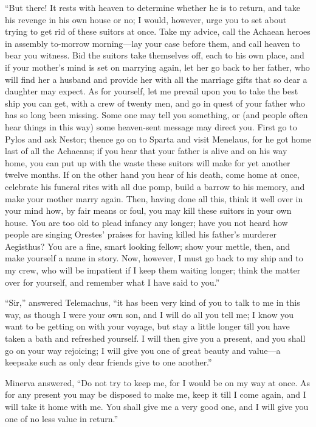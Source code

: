 “But there! It rests with heaven to determine whether he is to return, and take
his revenge in his own house or no; I would, however, urge you to set about
trying to get rid of these suitors at once. Take my advice, call the Achaean
heroes in assembly to-morrow morning—lay your case before them, and call heaven
to bear you witness. Bid the suitors take themselves off, each to his own
place, and if your mother’s mind is set on marrying again, let her go back to
her father, who will find her a husband and provide her with all the marriage
gifts that so dear a daughter may expect. As for yourself, let me prevail upon
you to take the best ship you can get, with a crew of twenty men, and go in
quest of your father who has so long been missing. Some one may tell you
something, or (and people often hear things in this way) some heaven-sent
message may direct you. First go to Pylos and ask Nestor; thence go on to
Sparta and visit Menelaus, for he got home last of all the Achaeans; if you
hear that your father is alive and on his way home, you can put up with the
waste these suitors will make for yet another twelve months. If on the other
hand you hear of his death, come home at once, celebrate his funeral rites with
all due pomp, build a barrow to his memory, and make your mother marry again.
Then, having done all this, think it well over in your mind how, by fair means
or foul, you may kill these suitors in your own house. You are too old to plead
infancy any longer; have you not heard how people are singing Orestes’ praises
for having killed his father’s murderer Aegisthus? You are a fine, smart
looking fellow; show your mettle, then, and make yourself a name in story. Now,
however, I must go back to my ship and to my crew, who will be impatient if I
keep them waiting longer; think the matter over for yourself, and remember what
I have said to you.”

“Sir,” answered Telemachus, “it has been very kind of you to talk to me in this
way, as though I were your own son, and I will do all you tell me; I know you
want to be getting on with your voyage, but stay a little longer till you have
taken a bath and refreshed yourself. I will then give you a present, and you
shall go on your way rejoicing; I will give you one of great beauty and value—a
keepsake such as only dear friends give to one another.”

Minerva answered, “Do not try to keep me, for I would be on my way at once. As
for any present you may be disposed to make me, keep it till I come again, and
I will take it home with me. You shall give me a very good one, and I will give
you one of no less value in return.”

